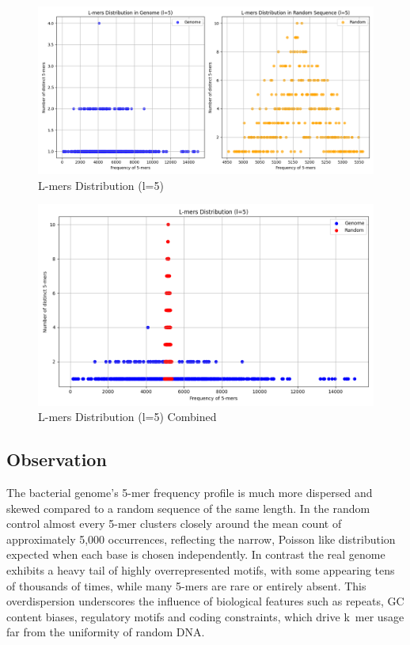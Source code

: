 \documentclass{article}
\begin{document}
\begin{figure}[H]
    \centering
    \includegraphics[width = \linewidth]{lmer_distribution_both.png}
     \caption{L-mers Distribution (l={5})}
\end{figure}

\begin{figure}[H]
    \centering
    \includegraphics[width = \linewidth]{lmer_distribution.png}
     \caption{L-mers Distribution (l={5}) Combined}
\end{figure}

\subsection*{Observation}
The bacterial genome’s 5-mer frequency profile is much more dispersed and skewed compared to a random sequence of the same length. In the random control almost every 5-mer clusters closely around the mean count of approximately 5,000 occurrences, reflecting the narrow, Poisson like distribution expected when each base is chosen independently. In contrast the real genome exhibits a heavy tail of highly overrepresented motifs, with some appearing tens of thousands of times, while many 5-mers are rare or entirely absent. This overdispersion underscores the influence of biological features such as repeats, GC content biases, regulatory motifs and coding constraints, which drive k mer usage far from the uniformity of random DNA.
\end{document}
